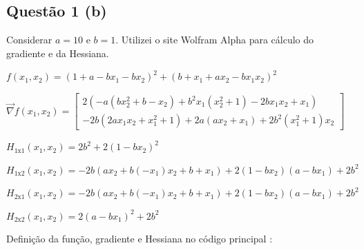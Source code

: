 \documentclass[10pt, a4paper]{article}
\begin{document}

\subsection{Questão 1 (b)}
Considerar $a = 10$ e $b = 1$. Utilizei o site Wolfram Alpha para cálculo do gradiente e da Hessiana.

\vspace{5mm}

\begin{center}
$f(x_1,x_2) = (1 + a -bx_1 - bx_2)^2 + (b + x_1 + ax_2 - bx_1x_2)^2$

\vspace{5mm}
$\overrightarrow{\nabla} f(x_1,x_2) = 
\begin{bmatrix}
  2(-a(bx_2^2 + b - x_2) + b^2x_1(x_2^2 + 1) -2bx_1x_2 + x_1) \\ -2b(2ax_1x_2 + x_1^2 + 1) + 2a(ax_2 + x_1) + 2b^2(x_1^2 +1)x_2
\end{bmatrix}$

\vspace{5mm}

$H_{1\text{x}1}(x_1,x_2) = 2b^2 + 2(1 - bx_2)^2$

$H_{1\text{x}2}(x_1,x_2) = -2b(ax_2 + b(-x_1)x_2 + b + x_1) + 2(1 - bx_2)(a - bx_1) + 2 b^2$

$H_{2\text{x}1}(x_1,x_2) = -2b(ax_2 + b(-x_1)x_2 + b + x_1) + 2(1 - bx_2) (a - bx_1) + 2 b^2$

$H_{2\text{x}2}(x_1,x_2) = 2(a - bx_1)^2 + 2b^2$

\end{center}

\vspace{5mm}

Definição da função, gradiente e Hessiana no código principal :
\end{document}
